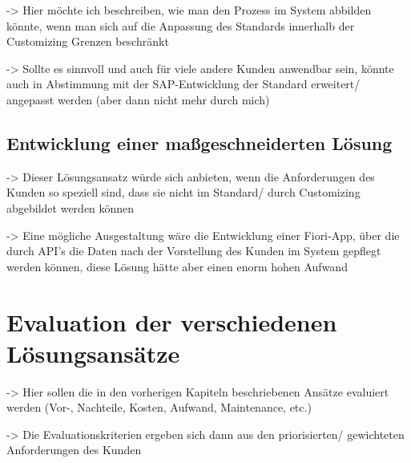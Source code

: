 -> Hier möchte ich beschreiben, wie man den Prozess im System abbilden könnte, wenn man sich auf die Anpassung des Standards innerhalb der Customizing Grenzen beschränkt

-> Sollte es sinnvoll und auch für viele andere Kunden anwendbar sein, könnte auch in Abstimmung mit der SAP-Entwicklung der Standard erweitert/ angepasst werden (aber dann nicht mehr durch mich)

\subsection{Entwicklung einer ma\ss geschneiderten Lösung}

-> Dieser Lösungsansatz würde sich anbieten, wenn die Anforderungen des Kunden so speziell sind, dass sie nicht im Standard/ durch Customizing abgebildet werden können

-> Eine mögliche Ausgestaltung wäre die Entwicklung einer Fiori-App, über die durch API's die Daten nach der Vorstellung des Kunden im System gepflegt werden können, diese Lösung hätte aber einen enorm hohen Aufwand

\section{Evaluation der verschiedenen Lösungsansätze}

-> Hier sollen die in den vorherigen Kapiteln beschriebenen Ansätze evaluiert werden (Vor-, Nachteile, Kosten, Aufwand, Maintenance, etc.)

-> Die Evaluationskriterien ergeben sich dann aus den priorisierten/ gewichteten Anforderungen des Kunden